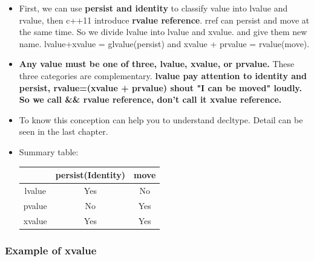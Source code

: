 \documentclass[a4paper,12pt,twoside]{book}
\begin{document}
\begin{itemize}
\item First, we can use \textbf{persist and identity} to classify value into lvalue and rvalue, then c++11 introduce \textbf{rvalue reference}. rref can persist and move at the same time.  So we divide lvalue into lvalue and xvalue.  and give them new name.  lvalue+xvalue = glvalue(persist)  and xvalue + prvalue = rvalue(move).

\item \textbf{Any value must be one of three, lvalue, xvalue, or prvalue.} These three categories are complementary.  \textbf{lvalue pay attention to  identity and persist, rvalue=(xvalue + prvalue) shout "I can be moved" loudly.  So we call \&\& rvalue reference, don't call it xvalue reference. }

\item To know this conception can help you to understand decltype. Detail can be seen in the last chapter.

\item Summary table:
\begin{tabular}{|c|c|c|}
\hline
 & persist(Identity) & move \\
\hline
lvalue & Yes & No \\
\hline
pvalue & No & Yes \\
\hline
xvalue & Yes & Yes \\
\hline
\end{tabular}

\end{itemize}

\subsubsection{Example of xvalue}
\end{document}
